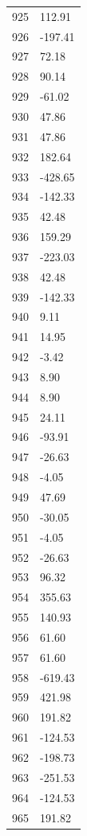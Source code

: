 \documentclass[a4paper,11pt]{article}
\begin{document}
\begin{center}
\begin{longtable}{|R{1.5cm}|R{2.5cm}|}
  925 &       112.91 \\
  926 &      -197.41 \\
  927 &        72.18 \\
  928 &        90.14 \\
  929 &       -61.02 \\
  930 &        47.86 \\
  931 &        47.86 \\
  932 &       182.64 \\
  933 &      -428.65 \\
  934 &      -142.33 \\
  935 &        42.48 \\
  936 &       159.29 \\
  937 &      -223.03 \\
  938 &        42.48 \\
  939 &      -142.33 \\
  940 &         9.11 \\
  941 &        14.95 \\
  942 &        -3.42 \\
  943 &         8.90 \\
  944 &         8.90 \\
  945 &        24.11 \\
  946 &       -93.91 \\
  947 &       -26.63 \\
  948 &        -4.05 \\
  949 &        47.69 \\
  950 &       -30.05 \\
  951 &        -4.05 \\
  952 &       -26.63 \\
  953 &        96.32 \\
  954 &       355.63 \\
  955 &       140.93 \\
  956 &        61.60 \\
  957 &        61.60 \\
  958 &      -619.43 \\
  959 &       421.98 \\
  960 &       191.82 \\
  961 &      -124.53 \\
  962 &      -198.73 \\
  963 &      -251.53 \\
  964 &      -124.53 \\
  965 &       191.82 \\

\end{longtable}
\end{center}
\end{document}
